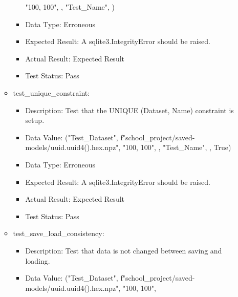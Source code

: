 \documentclass[./project-report/src/latex/project-report.tex]{subfiles}
\begin{document}
\begin{itemize}
\begin{itemize}
\begin{itemize}
                     "100, 100", , \newline
                     "Test\_Name", )
				\item Data Type: Erroneous
				\item Expected Result: A sqlite3.IntegrityError should be raised.
				\item Actual Result: Expected Result
				\item Test Status: Pass
			\end{itemize}
			\item test\_unique\_constraint:
			\begin{itemize}
				\item Description: Test that the UNIQUE (Dataset, Name) constraint is setup.
				\item Data Value: \newline
					  ("Test\_Dataset", \newline
                     f"school\_project/saved-models/{uuid.uuid4().hex}.npz", \newline
                     "100, 100", , \newline
                     "Test\_Name", , \newline
                     True)
				\item Data Type: Erroneous
				\item Expected Result: A sqlite3.IntegrityError should be raised.
				\item Actual Result: Expected Result
				\item Test Status: Pass
			\end{itemize}
			\item test\_save\_load\_consistency:
			\begin{itemize}
				\item Description: Test that data is not changed between saving and loading.
				\item Data Value: \newline
					  ("Test\_Dataset", \newline
                      f"school\_project/saved-models/{uuid.uuid4().hex}.npz", \newline
                      "100, 100", \newline

\end{itemize}
\end{itemize}
\end{itemize}
\end{document}
